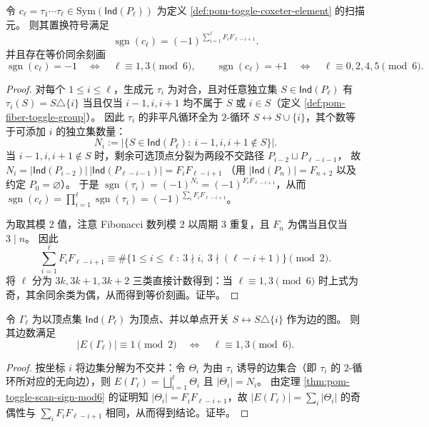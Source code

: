 \begin{theorem}\label{thm:pom-toggle-scan-sign-mod6}
令 \(c_\ell=\tau_1\cdots\tau_\ell\in\mathrm{Sym}(\mathsf{Ind}(P_\ell))\) 为定义 \ref{def:pom-toggle-coxeter-element} 的扫描元。
则其置换符号满足
\[
\operatorname{sgn}(c_\ell)=(-1)^{\sum_{i=1}^{\ell}F_iF_{\ell-i+1}}.
\]
并且存在等价同余刻画
\[
\operatorname{sgn}(c_\ell)=-1\quad\Longleftrightarrow\quad \ell\equiv 1,3\pmod 6,
\qquad
\operatorname{sgn}(c_\ell)=+1\quad\Longleftrightarrow\quad \ell\equiv 0,2,4,5\pmod 6.
\]
\end{theorem}

\begin{proof}
对每个 \(1\le i\le \ell\)，生成元 \(\tau_i\) 为对合，且对任意独立集 \(S\in\mathsf{Ind}(P_\ell)\) 有 \(\tau_i(S)=S\triangle\{i\}\) 当且仅当 \(i-1,i,i+1\) 均不属于 \(S\) 或 \(i\in S\)（定义 \ref{def:pom-fiber-toggle-group}）。
因此 \(\tau_i\) 的非平凡循环全为 \(2\)-循环 \(S\leftrightarrow S\cup\{i\}\)，其个数等于可添加 \(i\) 的独立集数量：
\[
N_i:=\bigl|\{S\in\mathsf{Ind}(P_\ell):\ i-1,i,i+1\notin S\}\bigr|.
\]
当 \(i-1,i,i+1\notin S\) 时，剩余可选顶点分裂为两段不交路径
\(
P_{i-2}\sqcup P_{\ell-i-1}
\)，
故
\(
N_i=|\mathsf{Ind}(P_{i-2})|\,|\mathsf{Ind}(P_{\ell-i-1})|
=F_iF_{\ell-i+1}
\)
（用 \(|\mathsf{Ind}(P_n)|=F_{n+2}\) 以及约定 \(P_0=\varnothing\)）。
于是 \(\operatorname{sgn}(\tau_i)=(-1)^{N_i}=(-1)^{F_iF_{\ell-i+1}}\)，从而
\(
\operatorname{sgn}(c_\ell)=\prod_{i=1}^{\ell}\operatorname{sgn}(\tau_i)
=(-1)^{\sum_iF_iF_{\ell-i+1}}
\)。
\par
为取其模 \(2\) 值，注意 Fibonacci 数列模 \(2\) 以周期 \(3\) 重复，且 \(F_n\) 为偶当且仅当 \(3\mid n\)。
因此
\[
\sum_{i=1}^{\ell}F_iF_{\ell-i+1}\equiv
\#\{1\le i\le \ell:\ 3\nmid i,\ 3\nmid(\ell-i+1)\}\pmod 2.
\]
将 \(\ell\) 分为 \(3k,3k+1,3k+2\) 三类直接计数得到：当 \(\ell\equiv 1,3\pmod 6\) 时上式为奇，其余同余类为偶，从而得到等价刻画。证毕。
\end{proof}

\begin{corollary}\label{cor:pom-toggle-fibcube-edge-parity}
令 \(\Gamma_\ell\) 为以顶点集 \(\mathsf{Ind}(P_\ell)\) 为顶点、并以单点开关 \(S\leftrightarrow S\triangle\{i\}\) 作为边的图。
则其边数满足
\[
|E(\Gamma_\ell)|\equiv 1\pmod 2\quad\Longleftrightarrow\quad \ell\equiv 1,3\pmod 6.
\]
\end{corollary}

\begin{proof}
按坐标 \(i\) 将边集分解为不交并：令 \(\Theta_i\) 为由 \(\tau_i\) 诱导的边集合（即 \(\tau_i\) 的 \(2\)-循环所对应的无向边），则 \(E(\Gamma_\ell)=\bigsqcup_{i=1}^{\ell}\Theta_i\) 且 \(|\Theta_i|=N_i\)。
由定理 \ref{thm:pom-toggle-scan-sign-mod6} 的证明知 \(|\Theta_i|=F_iF_{\ell-i+1}\)，故
\(
|E(\Gamma_\ell)|=\sum_i|\Theta_i|
\)
的奇偶性与 \(\sum_iF_iF_{\ell-i+1}\) 相同，从而得到结论。证毕。
\end{proof}

